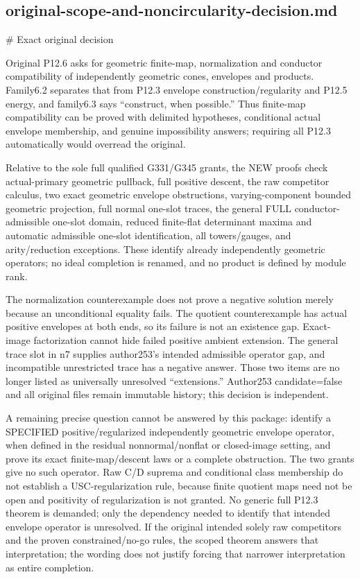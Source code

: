 \documentclass[11pt]{article}
\begin{document}
\subsection*{original-scope-and-noncircularity-decision.md}
\begin{GrantData}
# Exact original decision

Original P12.6 asks for geometric finite-map, normalization and conductor compatibility of independently geometric cones, envelopes and products. Family6.2 separates that from P12.3 envelope construction/regularity and P12.5 energy, and family6.3 says “construct, when possible.” Thus finite-map compatibility can be proved with delimited hypotheses, conditional actual envelope membership, and genuine impossibility answers; requiring all P12.3 automatically would overread the original.

Relative to the sole full qualified G331/G345 grants, the NEW proofs check actual-primary geometric pullback, full positive descent, the raw competitor calculus, two exact geometric envelope obstructions, varying-component bounded geometric projection, full normal one-slot traces, the general FULL conductor-admissible one-slot domain, reduced finite-flat determinant maxima and automatic admissible one-slot identification, all towers/gauges, and arity/reduction exceptions. These identify already independently geometric operators; no ideal completion is renamed, and no product is defined by module rank.

The normalization counterexample does not prove a negative solution merely because an unconditional equality fails. The quotient counterexample has actual positive envelopes at both ends, so its failure is not an existence gap. Exact-image factorization cannot hide failed positive ambient extension. The general trace slot in n7 supplies author253's intended admissible operator gap, and incompatible unrestricted trace has a negative answer. Those two items are no longer listed as universally unresolved “extensions.” Author253 candidate=false and all original files remain immutable history; this decision is independent.

A remaining precise question cannot be answered by this package: identify a SPECIFIED positive/regularized independently geometric envelope operator, when defined in the residual nonnormal/nonflat or closed-image setting, and prove its exact finite-map/descent laws or a complete obstruction. The two grants give no such operator. Raw C/D suprema and conditional class membership do not establish a USC-regularization rule, because finite quotient maps need not be open and positivity of regularization is not granted. No generic full P12.3 theorem is demanded; only the dependency needed to identify that intended envelope operator is unresolved. If the original intended solely raw competitors and the proven constrained/no-go rules, the scoped theorem answers that interpretation; the wording does not justify forcing that narrower interpretation as entire completion.


\end{GrantData}
\end{document}
